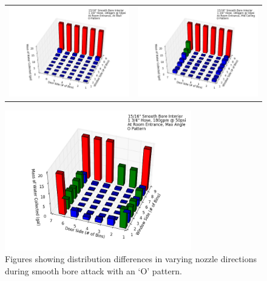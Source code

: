 \documentclass{article}
\begin{document}
\clearpage


\begin{figure}[ht]
\begin{tabular*}{\textwidth}{lr}
\includegraphics[width=3.2in]{../ADD_Analysis/Figures/15-12-09_144524_Datafile_15_16in_Smooth_Bore_Interior.png} &
\includegraphics[width=3.2in]{../ADD_Analysis/Figures/15-12-09_145534_Datafile_15_16in_Smooth_Bore_Interior.png} \\
\end{tabular*}
\centering
\includegraphics[width=3.2in]{../ADD_Analysis/Figures/15-12-09_150300_Datafile_15_16in_Smooth_Bore_Interior.png}
\caption{Figures showing distribution differences in varying nozzle directions during smooth bore attack with an `O' pattern.}
\label{fig:Interior_Varying_Nozzle_Direction_SB_O_Pattern}
\end{figure}
\end{document}
